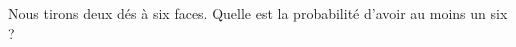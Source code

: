 
\begin{exercice}\label{exosmath-0214}

    Nous tirons deux dés à six faces. Quelle est la probabilité d'avoir au moins un six ?

\end{exercice}
